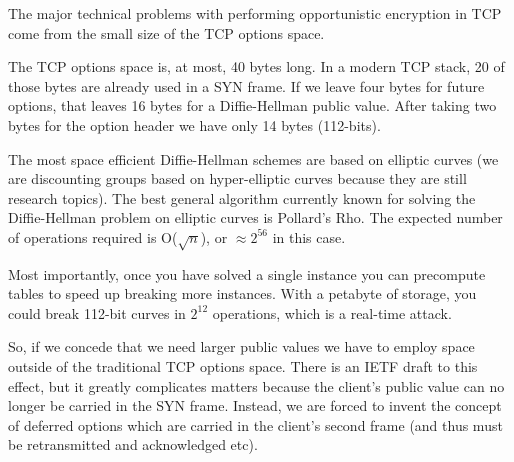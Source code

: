 \documentclass[conference]{IEEEtran}
\begin{document}

The major technical problems with performing opportunistic encryption in TCP
come from the small size of the TCP options space.

The TCP options space is, at most, 40 bytes long. In a modern TCP stack, 20 of
those bytes are already used in a SYN frame. If we leave four bytes for future
options, that leaves 16 bytes for a Diffie-Hellman public value. After taking two
bytes for the option header we have only 14 bytes (112-bits).

The most space efficient Diffie-Hellman schemes are based on elliptic curves
(we are discounting groups based on hyper-elliptic curves\cite{edwards} because
they are still research topics). The best general algorithm currently known
for solving the Diffie-Hellman problem on elliptic curves is Pollard's Rho.
  The expected number of operations required is O($\sqrt{n}$), or $\approx 2^{56}$ in
this case.

Most importantly, once you have solved a single instance you can precompute
tables to speed up breaking more instances. With a petabyte of storage, you
could break 112-bit curves in $2^{12}$ operations, which is a real-time attack.

So, if we concede that we need larger public values we have to employ space
outside of the traditional TCP options space. There is an IETF draft to this
effect\cite{tcploo}, but it greatly complicates matters because the client's
public value can no longer be carried in the SYN frame. Instead, we are forced
to invent the concept of deferred options which are carried in the client's
second frame (and thus must be retransmitted and acknowledged etc).






\end{document}
